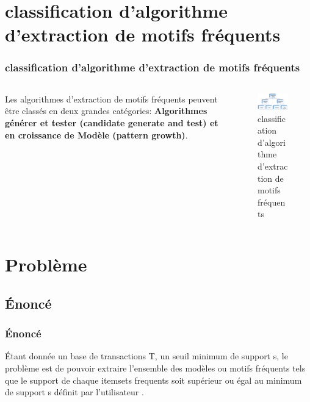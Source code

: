 \documentclass{beamer}
\begin{document}
\section[classification d'algorithme  d'extraction de motifs fréquents]{classification d'algorithme  d'extraction de motifs fréquents}
\frame
{
\frametitle{classification d'algorithme  d'extraction de motifs fréquents}

\begin{columns} 

\begin{column}{.3\textwidth}
	\par {\small Les algorithmes d'extraction de motifs fréquents peuvent être classés en deux grandes catégories: \textbf{Algorithmes générer et tester (candidate generate and test) et en croissance de Modèle (pattern growth)}. }
\end{column}

\begin{column}{.7\textwidth}

\begin{figure}[htbp]
\begin{center}
\includegraphics[scale=0.5]{images/class.png}
\caption{classification d'algorithme  d'extraction de motifs fréquents \cite{USDB}}
\label{default}
\end{center}
\end{figure}

\end{column}

\end{columns} 
}

\section[Problème]{Problème}
\subsection[Énoncé]{Énoncé}
\frame
{
  \frametitle{Énoncé}
Étant donnée un base de  transactions T, un seuil minimum de support s, le problème est de pouvoir extraire l'ensemble des modèles ou motifs fréquents  tels que le support de chaque itemsets frequents soit supérieur ou égal au minimum de support s définit par l'utilisateur \cite{persoliriscnrs}.
}
\end{document}
